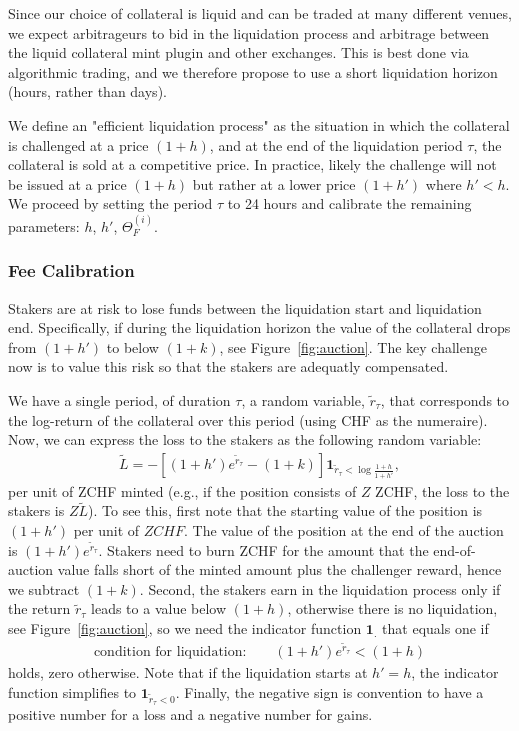 \documentclass[english,11pt]{article}
\begin{document}
Since our choice of collateral is liquid and can be traded at many different venues,
we expect arbitrageurs to bid in the liquidation process and arbitrage
between the liquid collateral mint plugin and other exchanges.
This is best done via algorithmic trading, and we therefore propose to use a short
liquidation horizon (hours, rather than days).

We define an "efficient liquidation process" as the situation in which
the collateral is challenged at a price $(1+h)$, and at the end of the
liquidation period $\tau$, the collateral is sold at a competitive price.
In practice, likely the challenge will not be issued at a price $(1+h)$ but
rather at a lower price $(1+h')$ where $h'<h$.
We proceed by setting the period $\tau$ to 24 hours and calibrate the remaining parameters:
$h$, $h'$, $\Theta_F^{(i)}$.

\subsubsection{Fee Calibration}
Stakers are at risk to lose funds between the liquidation start and liquidation end.
Specifically, if during the liquidation horizon the value of the collateral drops 
from $(1+h')$ to below $(1+k)$, see Figure~\ref{fig:auction}.
The key challenge now is to value this risk so that the stakers
are adequatly compensated.

We have a single period, of duration $\tau$, a random
variable, $\tilde{r}_{\tau}$, that corresponds to the log-return of the collateral over this period (using CHF as the numeraire).
Now, we can express the loss to the stakers as the following random variable:
\begin{align}
\tilde{L} = - \left[(1 + h') e^{\tilde{r}_{\tau}} - (1+k)\right] \mathbf{1}_{\tilde{r}_{\tau}<\log \frac{1+h}{1+h'}},\label{eq:loss}
\end{align}
per unit of ZCHF minted (e.g., if the position consists of $Z$ ZCHF, the loss to the stakers is $Z\tilde{L}$).
To see this, first note that the starting value of the position is $(1 + h')$ per unit of $ZCHF$.
The value of the position
at the end of the auction is $(1 + h') e^{\tilde{r}_{\tau}}$. Stakers need to burn ZCHF for the amount that the end-of-auction value falls short
of the minted amount plus the challenger reward, hence we subtract $(1+k)$. 
Second, the stakers earn in the liquidation process only if the return $\tilde{r}_{\tau}$ leads to a value below $(1+h)$, otherwise
there is no liquidation, see
Figure~\ref{fig:auction}, so we need the indicator function $\mathbf{1}_{.}$ that equals one if
\begin{align}
\text{condition for liquidation:} \qquad(1+h')e^{\tilde{r}_{\tau}} < (1+h)\label{eq:liqcond}
\end{align}
holds, zero otherwise. Note that if the liquidation starts at $h'=h$, 
the indicator function simplifies to $\mathbf{1}_{\tilde{r}_{\tau}<0}$.
Finally, the negative sign is 
convention to have a positive number for a loss and a negative number for gains.
\end{document}
